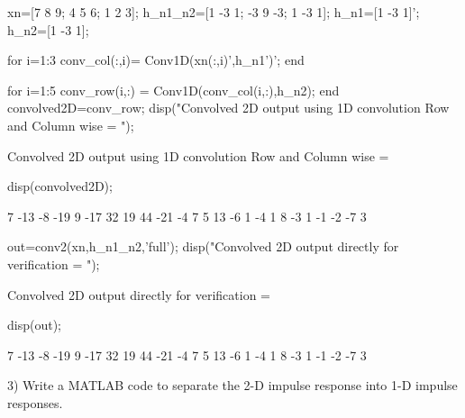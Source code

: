 \documentclass[12pt, onecolumn]{IEEEtran}
\begin{document}


\vspace{1em}
\begin{matlabcode}
xn=[7 8 9; 4 5 6; 1 2 3];
h_n1_n2=[1 -3 1; -3 9 -3; 1 -3 1];
h_n1=[1 -3 1]';
h_n2=[1 -3 1];

for i=1:3
conv_col(:,i)= Conv1D(xn(:,i)',h_n1')'; %
end

for i=1:5
conv_row(i,:) = Conv1D(conv_col(i,:),h_n2);
end
convolved2D=conv_row;
disp("Convolved 2D output using 1D convolution Row and Column wise = ");
\end{matlabcode}
\begin{matlaboutput}
Convolved 2D output using 1D convolution Row and Column wise = 
\end{matlaboutput}
\begin{matlabcode}
disp(convolved2D);
\end{matlabcode}
\begin{matlaboutput}
     7   -13    -8   -19     9
   -17    32    19    44   -21
    -4     7     5    13    -6
     1    -4     1     8    -3
     1    -1    -2    -7     3
\end{matlaboutput}
\begin{matlabcode}
out=conv2(xn,h_n1_n2,'full');
disp("Convolved 2D output directly for verification = ");
\end{matlabcode}
\begin{matlaboutput}
Convolved 2D output directly for verification = 
\end{matlaboutput}
\begin{matlabcode}
disp(out);
\end{matlabcode}
\begin{matlaboutput}
     7   -13    -8   -19     9
   -17    32    19    44   -21
    -4     7     5    13    -6
     1    -4     1     8    -3
     1    -1    -2    -7     3
\end{matlaboutput}

\begin{par}
\begin{flushleft}
3) Write a MATLAB code to separate the 2-D impulse response into 1-D impulse responses.
\end{flushleft}
\end{par}
\end{document}
